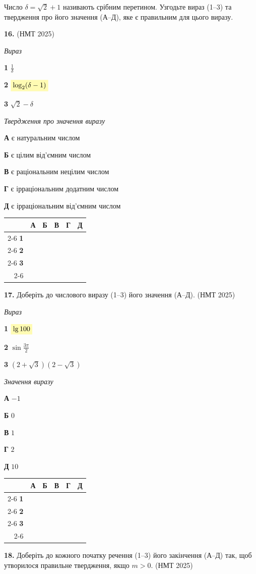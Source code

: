 \documentclass[14pt]{extarticle}
\newcommand{\answerGrid}{
    \begingroup
    \renewcommand{\arraystretch}{1.3} 
    \setlength{\tabcolsep}{7pt} 
    \begin{tabular}{r|c|c|c|c|c|}
         \multicolumn{1}{c}{} & \multicolumn{1}{c}{\textbf{А}} & \multicolumn{1}{c}{\textbf{Б}} & \multicolumn{1}{c}{\textbf{В}} & \multicolumn{1}{c}{\textbf{Г}} & \multicolumn{1}{c}{\textbf{Д}} \\ \cline{2-6}
         \textbf{1} & & & & & \\ \cline{2-6}
         \textbf{2} & & & & & \\ \cline{2-6}
         \textbf{3} & & & & & \\ \cline{2-6}
    \end{tabular}
    \endgroup
}
\newcommand{\matchingLayout}[3]{
    \noindent
    \begin{minipage}[t]{0.40\textwidth}
        #1
    \end{minipage}%
    \hfill
    \begin{minipage}[t]{0.28\textwidth}
        #2
    \end{minipage}%
    \hfill
    \begin{minipage}[t]{0.30\textwidth}
        \vspace{0pt}
        \begin{flushright}
        #3
        \end{flushright}
    \end{minipage}
}
\newcommand{\nmtyear}[1]{\hfill{\small\color{yearcolor}(НМТ #1)}}
\begin{document}
\vspace{0.8cm}

\noindent Число $\delta = \sqrt{2} + 1$ називають срібним перетином. Узгодьте вираз (1--3) та твердження про його значення (А--Д), яке є правильним для цього виразу.

\noindent\textbf{16.} \nmtyear{2025}
\vspace{0.3cm}

\matchingLayout{\textit{Вираз}

\textbf{1} \quad $\displaystyle\frac{1}{\delta}$

\textbf{2} \quad $\colorbox{yellow!30}{$\log_2 (\delta - 1)$}$

\textbf{3} \quad $\sqrt{2} - \delta$
}{
\textit{Твердження про значення виразу}

\textbf{А} \quad є натуральним числом

\textbf{Б} \quad є цілим від'ємним числом

\textbf{В} \quad є раціональним нецілим числом

\textbf{Г} \quad є ірраціональним додатним числом

\textbf{Д} \quad є ірраціональним від'ємним числом
}{
\answerGrid
}

\vspace{0.8cm}

\noindent\textbf{17.} Доберіть до числового виразу (1--3) його значення (А--Д). \nmtyear{2025}
\vspace{0.3cm}

\matchingLayout{\textit{Вираз}

\textbf{1} \quad $\colorbox{yellow!30}{$\lg 100$}$

\textbf{2} \quad $\sin \displaystyle\frac{3\pi}{2}$

\textbf{3} \quad $(2 + \sqrt{3})(2 - \sqrt{3})$
}{
\textit{Значення виразу}

\textbf{А} \quad $-1$

\textbf{Б} \quad $0$

\textbf{В} \quad $1$

\textbf{Г} \quad $2$

\textbf{Д} \quad $10$
}{
\answerGrid
}

\vspace{0.8cm}

\noindent\textbf{18.} Доберіть до кожного початку речення (1--3) його закінчення (А--Д) так, щоб утворилося правильне твердження, якщо $m > 0$. \nmtyear{2025}
\vspace{0.3cm}
\end{document}
